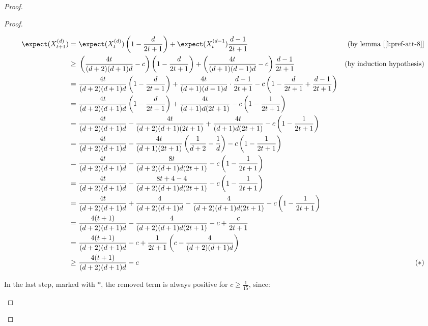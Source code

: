 \begin{proof}
\begin{proof}
\begin{itemize}
{                \scriptsize\begin{align*}
                    \expect(X_{t + 1}^{(d)}) =&\ \expect(X_t^{(d)}) \left( 1 - \frac{d}{2t + 1} \right) + \expect(X_t^{(d - 1}) \frac{d - 1}{2t + 1} & \text{(by lemma [\ref{l:pref-att-8}]} \\
                    \geq&\ \left( \frac{4t}{(d + 2)(d + 1)d} - c \right) \left( 1 - \frac{d}{2t + 1} \right) + \left( \frac{4t}{(d + 1)(d - 1)d} - c \right) \frac{d - 1}{2t +1 } & \text{(by induction hypothesis)} \\
                       =&\ \frac{4t}{(d + 2)(d + 1)d} \left( 1 - \frac{d}{2t + 1} \right) + \frac{4t}{(d + 1)(d - 1)d} \cdot \frac{d - 1}{2t + 1} - c \left( 1 - \frac{d}{2t + 1} + \frac{d - 1}{2t + 1}\right) & \\
                       =&\ \frac{4t}{(d + 2)(d + 1)d} \left( 1 - \frac{d}{2t + 1} \right) + \frac{4t}{(d + 1)d(2t + 1)} - c \left( 1 - \frac{1}{2t + 1}\right) & \\
                       =&\ \frac{4t}{(d + 2)(d + 1)d} - \frac{4t}{(d + 2)(d + 1)(2t + 1)} + \frac{4t}{(d + 1)d(2t + 1)} - c \left( 1 - \frac{1}{2t + 1}\right) & \\
                       =&\ \frac{4t}{(d + 2)(d + 1)d} - \frac{4t}{(d + 1)(2t + 1)} \left( \frac{1}{d + 2} - \frac{1}{d} \right) - c \left( 1 - \frac{1}{2t + 1}\right) & \\
                       =&\ \frac{4t}{(d + 2)(d + 1)d} - \frac{8t}{(d + 2)(d + 1)d(2t + 1)} - c \left( 1 - \frac{1}{2t + 1}\right) & \\
                       =&\ \frac{4t}{(d + 2)(d + 1)d} - \frac{8t + 4 - 4}{(d + 2)(d + 1)d(2t + 1)} - c \left( 1 - \frac{1}{2t + 1}\right) & \\
                       =&\ \frac{4t}{(d + 2)(d + 1)d} + \frac{4}{(d + 2)(d + 1)d} - \frac{4}{(d + 2)(d + 1)d(2t + 1)} - c \left( 1 - \frac{1}{2t + 1}\right) & \\
                       =&\ \frac{4(t + 1)}{(d + 2)(d + 1)d} - \frac{4}{(d + 2)(d + 1)d(2t + 1)} - c + \frac{c}{2t + 1} & \\
                       =&\ \frac{4(t + 1)}{(d + 2)(d + 1)d} - c + \frac{1}{2t + 1} \left( c - \frac{4}{(d + 2)(d + 1)d} \right) & \\
                    \geq&\ \frac{4(t + 1)}{(d + 2)(d + 1)d} - c & (*)
                \end{align*}


                In the last step, marked with $*$, the removed term is always positive for $c \geq \frac{1}{15}$, since:
                
}
\end{itemize}
\end{proof}
\end{proof}
